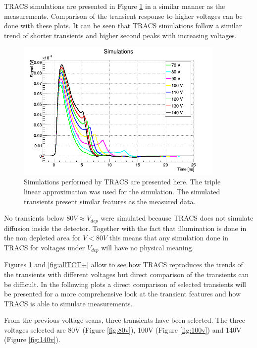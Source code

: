 TRACS simulations are presented in Figure \ref{fig:allSims} in a similar manner as the measurements. Comparison of the transient response to higher voltages can be done with these plots. It can be seen that TRACS simulations follow a similar trend of shorter transients and higher second peaks with increasing voltages.

\begin{figure}[H]
	\centering
	\centering
	\includegraphics[width=0.9\textwidth]{AllSims.png}
	\caption{Simulations performed by TRACS are presented here. The triple linear approximation was used for the simulation. The simulated transients present similar features as the measured data.}
	\label{fig:allSims}
\end{figure}

No transients below $80V \approx V_{dep}$ were simulated because TRACS does not simulate diffusion inside the detector. Together with the fact that illumination is done in the non depleted area for $V < 80V$ this means that any simulation done in TRACS for voltages under $V_{dep}$ will have no physical meaning.

Figures \ref{fig:allSims} and \ref{fig:allTCT+} allow to see how TRACS reproduces the trends of the transients with different voltages but direct comparison of the transients can be difficult. In the following plots a direct comparison of selected transients will be presented for a more comprehensive look at the transient features and how TRACS is able to simulate measurements.

From the previous voltage scans, three transients have been selected. The three voltages selected are 80V (Figure \ref{fig:80v}), 100V (Figure \ref{fig:100v}) and 140V (Figure \ref{fig:140v}). 

